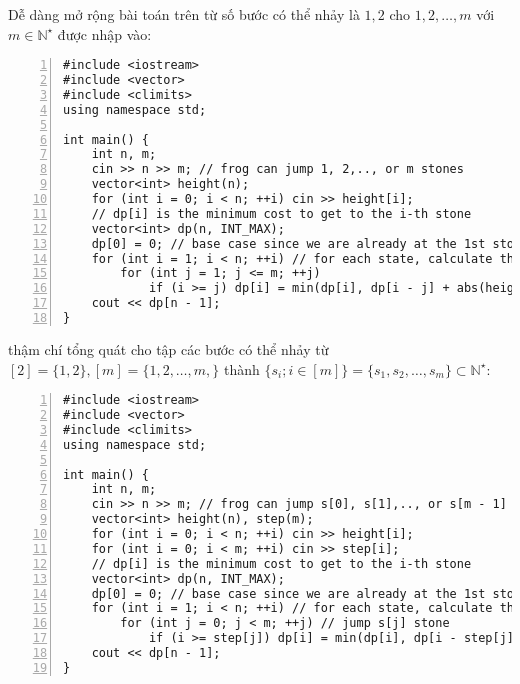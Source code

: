 \documentclass{article}
\begin{document}
Dễ dàng mở rộng bài toán trên từ số bước có thể nhảy là $1,2$ cho $1,2,\ldots,m$ với $m\in\mathbb{N}^\star$ được nhập vào:
\begin{Verbatim}[numbers=left,xleftmargin=5mm]
#include <iostream>
#include <vector>
#include <climits>
using namespace std;

int main() {
    int n, m;
    cin >> n >> m; // frog can jump 1, 2,.., or m stones
    vector<int> height(n);
    for (int i = 0; i < n; ++i) cin >> height[i];
    // dp[i] is the minimum cost to get to the i-th stone
    vector<int> dp(n, INT_MAX);
    dp[0] = 0; // base case since we are already at the 1st stone
    for (int i = 1; i < n; ++i) // for each state, calculate the states it leads to
        for (int j = 1; j <= m; ++j)
            if (i >= j) dp[i] = min(dp[i], dp[i - j] + abs(height[i] - height[i - j])); // jump j stone
    cout << dp[n - 1];
}
\end{Verbatim}
thậm chí tổng quát cho tập các bước có thể nhảy từ $[2] = \{1,2\},[m] = \{1,2,\ldots,m,\}$ thành $\{s_i;i\in[m]\} = \{s_1,s_2,\ldots,s_m\}\subset\mathbb{N}^\star$:
\begin{Verbatim}[numbers=left,xleftmargin=5mm]
#include <iostream>
#include <vector>
#include <climits>
using namespace std;

int main() {
    int n, m;
    cin >> n >> m; // frog can jump s[0], s[1],.., or s[m - 1] stones
    vector<int> height(n), step(m);
    for (int i = 0; i < n; ++i) cin >> height[i];
    for (int i = 0; i < m; ++i) cin >> step[i];
    // dp[i] is the minimum cost to get to the i-th stone
    vector<int> dp(n, INT_MAX);
    dp[0] = 0; // base case since we are already at the 1st stone
    for (int i = 1; i < n; ++i) // for each state, calculate the states it leads to
        for (int j = 0; j < m; ++j) // jump s[j] stone
            if (i >= step[j]) dp[i] = min(dp[i], dp[i - step[j]] + abs(height[i] - height[i - step[j]]));
    cout << dp[n - 1];
}
\end{Verbatim}

\end{document}
